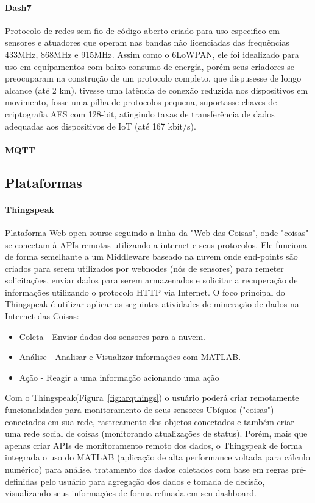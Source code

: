 \paragraph{Dash7}
Protocolo de redes sem fio de c\'odigo aberto criado para uso especifico em sensores e atuadores que operam nas bandas n\~ao licenciadas das frequ\^encias 433MHz, 868MHz e 915MHz. Assim como o 6LoWPAN, ele foi idealizado para uso em equipamentos com baixo consumo de energia, por\'em seus criadores se preocuparam na constru\c{c}\~ao de um protocolo completo, que dispusesse de longo alcance (at\'e 2 km), tivesse uma lat\^encia de conex\~ao reduzida nos dispositivos em movimento, fosse uma pilha de protocolos pequena, suportasse chaves de criptografia AES com 128-bit, atingindo taxas de transfer\^encia de dados adequadas aos dispositivos de IoT (at\'e  167 kbit/s).
\paragraph{MQTT}

\subsection{Plataformas}
\paragraph{Thingspeak}
	Plataforma Web open-sourse seguindo a linha da "Web das Coisas", onde "coisas" se conectam \`a APIs remotas utilizando a internet e seus protocolos. Ele funciona de forma semelhante a um Middleware baseado na nuvem onde end-points s\~ao criados para serem utilizados por webnodes (n\'os de sensores) para remeter solicita\c{c}\~oes, enviar dados para serem armazenados e solicitar a recupera\c{c}\~ao de informa\c{c}\~oes utilizando o protocolo HTTP via Internet. O foco principal do Thingspeak \'e utilizar aplicar as seguintes atividades de minera\c{c}\~ao de dados na Internet das Coisas:
	
	\begin{itemize}
		\item Coleta - Enviar dados dos sensores para a nuvem.
		\item An\'alise - Analisar e Visualizar informa\c{c}\~oes com MATLAB.
		\item A\c{c}\~ao - Reagir a uma informa\c{c}\~ao acionando uma a\c{c}\~ao
	\end{itemize}
	
	Com o Thingspeak(Figura~\ref{fig:arqthings}) o usu\'ario poder\'a criar remotamente funcionalidades para monitoramento de seus sensores Ub\'iquos ("coisas") conectados em sua rede, rastreamento dos objetos conectados e tamb\'em criar uma rede social de coisas (monitorando atualiza\c{c}\~oes de status). Por\'em, mais que apenas criar APIs de monitoramento remoto dos dados, o Thingspeak de forma integrada o uso do MATLAB (aplica\c{c}\~ao de alta performance voltada para c\'alculo num\'erico) para an\'alise, tratamento dos dados coletados com base em regras pr\'e-definidas pelo usu\'ario para agrega\c{c}\~ao dos dados e tomada de decis\~ao, visualizando seus informa\c{c}\~oes de forma refinada em seu dashboard.
	
